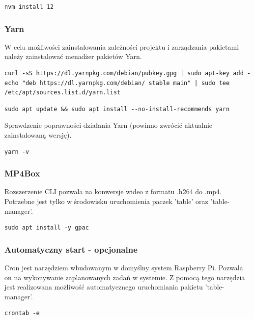\begin{lstlisting}[caption={Instalacja Node.js w wersji 12 poprzez NVM}]
nvm install 12
\end{lstlisting}

\subsubsection{Yarn}
W celu możliwości zainstalowania zależności projektu i zarządzania pakietami należy zainstalować menadżer pakietów Yarn.

\begin{lstlisting}[caption={Pobieranie yarn}]
curl -sS https://dl.yarnpkg.com/debian/pubkey.gpg | sudo apt-key add -echo "deb https://dl.yarnpkg.com/debian/ stable main" | sudo tee /etc/apt/sources.list.d/yarn.list
\end{lstlisting}

\begin{lstlisting}[caption={Instalacja yarn}]
sudo apt update && sudo apt install --no-install-recommends yarn
\end{lstlisting}

Sprawdzenie poprawności działania Yarn (powinno zwrócić aktualnie zainstalowaną wersję).
\begin{lstlisting}[caption={Pobranie aktualnej wersji yarn}]
yarn -v
\end{lstlisting}


\subsubsection{MP4Box}
Rozszerzenie CLI pozwala na konwersje wideo z formatu .h264 do .mp4. Potrzebne jest tylko w środowisku uruchomienia paczek 'table' oraz 'table-manager'.

\begin{lstlisting}[caption={Instalacja MP4Box}]
  sudo apt install -y gpac
\end{lstlisting}


\subsubsection{Automatyczny start - opcjonalne}
Cron jest narzędziem wbudowanym w domyślny system Raspberry Pi. Pozwala on na wykonywanie zaplanowanych zadań w systemie. Z pomocą tego narzędzia jest realizowana możliwość automatycznego uruchomiania pakietu 'table-manager'.\cite{RaspCronDocs}

\begin{lstlisting}[caption={Uruchomienie oraz konfiguracja crontab}]
crontab -e
\end{lstlisting}

